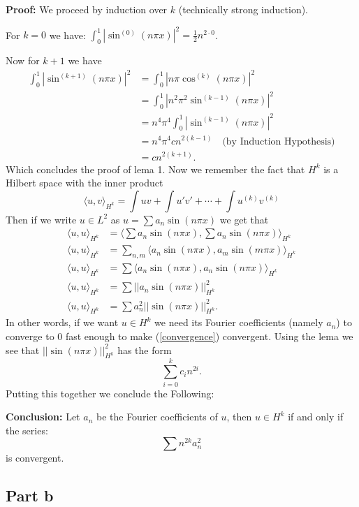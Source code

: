 \documentclass{article}
\begin{document}
\textbf{Proof:} We proceed by induction over $k$ (technically strong
induction).

For $k=0$ we have:
$\int_0^1 |\sin^{(0)}(n\pi x)|^2=\frac{1}{2}n^{2\cdot 0}$.

Now for $k+1$ we have
\begin{align*}
\int_0^1 |\sin^{(k+1)}(n\pi x)|^2
&= \int_0^1 |n\pi\cos^{(k)}(n\pi x)|^2\\
&= \int_0^1 |n^2\pi^2\sin^{(k-1)}(n\pi x)|^2\\
&= n^4\pi^4\int_0^1 |\sin^{(k-1)}(n\pi x)|^2\\
&= n^4\pi^4cn^{2(k-1)} \quad \text{(by Induction Hypothesis)}\\
&= cn^{2(k+1)}.
\end{align*}
Which concludes the proof of lema 1.
Now we remember the fact that $H^k$ is a Hilbert space with the inner product
\[
	\langle u,v\rangle_{H^k} = \int uv + \int u'v' + \cdots + \int u^{(k)}v^{(k)}
\]
Then if we write $u\in L^2$ as $u=\sum a_n\sin(n\pi x)$ we get that
\begin{align}
	\langle u,u\rangle_{H^k} &= \Big\langle \sum a_n\sin(n\pi x), \sum a_n\sin(n\pi x) \Big\rangle_{H^k}\nonumber\\
	\langle u,u\rangle_{H^k} &= \sum_{n,m}\langle a_n\sin(n\pi x),
	a_m\sin(m\pi x) \rangle_{H^k}\nonumber\\
	\langle u,u\rangle_{H^k} &= \sum\langle a_n\sin(n\pi x), a_n\sin(n\pi x) \rangle_{H^k}\nonumber\\
	\langle u,u\rangle_{H^k} &= \sum ||a_n\sin(n\pi x)||^2_{H^k}\nonumber\\
	\langle u,u\rangle_{H^k} &= \sum a_n^2||\sin(n\pi x)||^2_{H^k}\label{convergence}.
\end{align}
In other words, if we want $u\in H^k$ we need its Fourier coefficients (namely
$a_n$) to converge to 0 fast enough to make (\ref{convergence}) convergent.
Using the lema we see that $||\sin(n \pi x)||^2_{H^k}$ has the form
\[
	\sum_{i=0}^k c_in^{2i}.
\]
Putting this together we conclude the Following:

\textbf{Conclusion:} Let $a_n$ be the Fourier coefficients of $u$, then $u\in
H^k$ if and only if the series:
\[
	\sum n^{2k}a_n^2
\]
is convergent.
\subsection{Part b}
\end{document}
